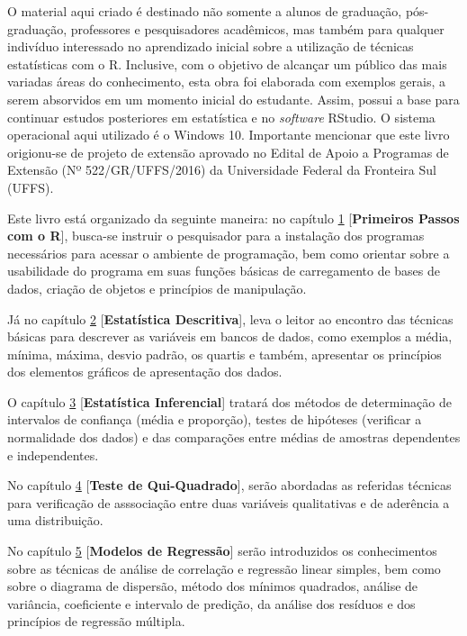 \documentclass[12pt,portuguese,oneside]{book}
\begin{document}
O material aqui criado é destinado não somente a alunos de graduação,
pós-graduação, professores e pesquisadores acadêmicos, mas também para
qualquer indivíduo interessado no aprendizado inicial sobre a utilização
de técnicas estatísticas com o R. Inclusive, com o objetivo de alcançar
um público das mais variadas áreas do conhecimento, esta obra foi
elaborada com exemplos gerais, a serem absorvidos em um momento inicial
do estudante. Assim, possui a base para continuar estudos posteriores em
estatística e no \emph{software} RStudio. O sistema operacional aqui
utilizado é o Windows 10. Importante mencionar que este livro
origionu-se de projeto de extensão aprovado no Edital de Apoio a
Programas de Extensão (Nº 522/GR/UFFS/2016) da Universidade Federal da
Fronteira Sul (UFFS).

Este livro está organizado da seguinte maneira: no capítulo
\protect\hyperlink{intro}{1} {[}\textbf{Primeiros Passos com o R}{]},
busca-se instruir o pesquisador para a instalação dos programas
necessários para acessar o ambiente de programação, bem como orientar
sobre a usabilidade do programa em suas funções básicas de carregamento
de bases de dados, criação de objetos e princípios de manipulação.

Já no capítulo \protect\hyperlink{desc}{2} {[}\textbf{Estatística
Descritiva}{]}, leva o leitor ao encontro das técnicas básicas para
descrever as variáveis em bancos de dados, como exemplos a média,
mínima, máxima, desvio padrão, os quartis e também, apresentar os
princípios dos elementos gráficos de apresentação dos dados.

O capítulo \protect\hyperlink{inf}{3} {[}\textbf{Estatística
Inferencial}{]} tratará dos métodos de determinação de intervalos de
confiança (média e proporção), testes de hipóteses (verificar a
normalidade dos dados) e das comparações entre médias de amostras
dependentes e independentes.

No capítulo \protect\hyperlink{qui}{4} {[}\textbf{Teste de
Qui-Quadrado}{]}, serão abordadas as referidas técnicas para verificação
de asssociação entre duas variáveis qualitativas e de aderência a uma
distribuição.

No capítulo \protect\hyperlink{reg}{5} {[}\textbf{Modelos de
Regressão}{]} serão introduzidos os conhecimentos sobre as técnicas de
análise de correlação e regressão linear simples, bem como sobre o
diagrama de dispersão, método dos mínimos quadrados, análise de
variância, coeficiente e intervalo de predição, da análise dos resíduos
e dos princípios de regressão múltipla.
\end{document}
